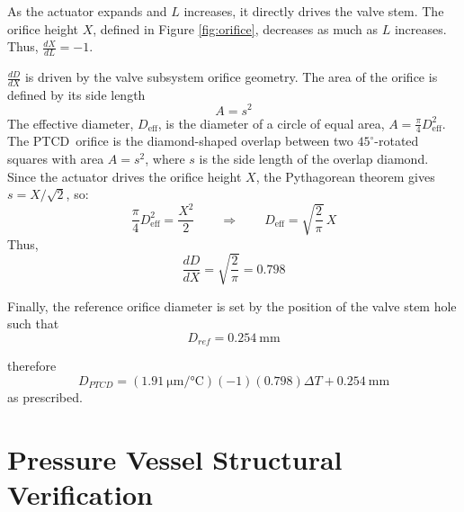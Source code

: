 \documentclass[12pt, letterpaper]{report}%
\newcounter{mycounter}           %
\newcounter{sub}[mycounter]      %
\newcommand{\device}{PTCD}
\begin{document}
\begin{appendices}
As the actuator expands and $L$ increases, it directly drives the valve stem. The orifice height $X$, defined in Figure \ref{fig:orifice}, decreases as much as $L$ increases.
Thus, $\frac{dX}{dL} = -1$.

$\frac{dD}{dX}$ is driven by the valve subsystem orifice geometry.
The area of the orifice is defined by its side length
$$A = s^2$$
The effective diameter, $D_\text{eff}$, is the diameter of a circle of equal area,
$A = \frac{\pi}{4} D_\text{eff}^2$.
The \device\ orifice is the diamond-shaped overlap between two $45^\circ$-rotated squares with area $A = s^2$, where $s$ is the side length of the overlap diamond.
Since the actuator drives the orifice height $X$,
the Pythagorean theorem gives $s = X/\sqrt{2}$, so:
\begin{equation}
    \frac{\pi}{4} D_\text{eff}^2 = \frac{X^2}{2}
    \qquad \Longrightarrow \qquad
    D_\text{eff} = \sqrt{\frac{2}{\pi}}\, X
    \label{eq:app_Deff_X}
\end{equation}
Thus,
\begin{equation}
    \frac{dD}{dX} = \sqrt{\frac{2}{\pi}} = 0.798
\end{equation}

Finally, the reference orifice diameter is set by the position of the valve stem hole such that
\begin{equation}
    D_{ref} = \SI{0.254}{\milli\meter}
\end{equation}

therefore
\begin{equation}
    D_{\device} = (\SI{1.91}{\micro\meter\per\celsius})(-1)(0.798) \Delta T + \SI{0.254}{\milli\meter}
\end{equation}
as prescribed.

\newpage
\section{Pressure Vessel Structural Verification}
\label{app:der:P}


\end{appendices}
\end{document}
